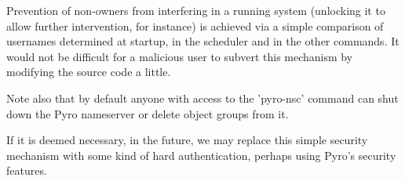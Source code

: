 
Prevention of non-owners from interfering in a running system (unlocking
it to allow further intervention, for instance) is achieved via a simple
comparison of usernames determined at startup, in the scheduler and in
the other commands. It would not be difficult for a malicious user
to subvert this mechanism by modifying the source code a little. 

Note also that by default anyone with access to the 'pyro-nsc' command
can shut down the Pyro nameserver or delete object groups from it. 

If it is deemed necessary, in the future, we may replace this simple
security mechanism with some kind of hard authentication, perhaps using
Pyro's security features.
